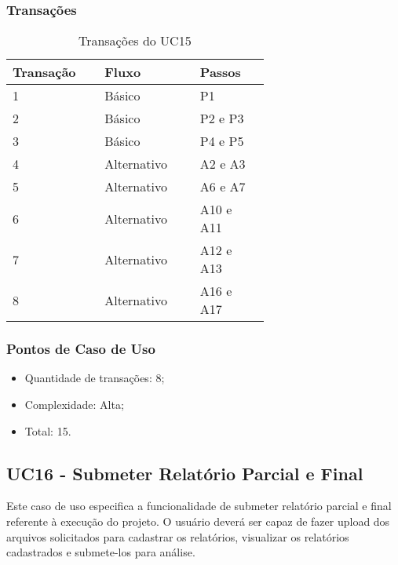   \subsubsection{Transações}

  \begin{table*}[!h]
  \centering
  \caption{Transações do UC15}
  \label{Rotulo}
    \begin{tabular}{|p{0.20\linewidth}|p{0.25\linewidth}|p{0.20\linewidth}|}
    \hline
    \textbf{Transação} & \textbf{Fluxo} & \textbf{Passos} \\ 
    \hline
    1 & Básico & P1\\
    \hline
    2 & Básico & P2 e P3\\
    \hline
    3 & Básico & P4 e P5\\
    \hline
    4 & Alternativo & A2 e A3\\
    \hline
    5 & Alternativo & A6 e A7\\
    \hline
    6 & Alternativo & A10 e A11\\
    \hline
    7 & Alternativo & A12 e A13\\
    \hline
    8 & Alternativo & A16 e A17\\
    \hline
    \end{tabular}
  \end{table*}

  \subsubsection{Pontos de Caso de Uso}

  \begin{itemize}
  \item Quantidade de transações: 8;
  \item Complexidade: Alta;
  \item Total: 15.
  \end{itemize}

  \vfill
  
\pagebreak
\subsection{UC16 - Submeter Relatório Parcial e Final}
  
  Este caso de uso especifica a funcionalidade de submeter relatório parcial e final referente à execução do projeto.
  O usuário deverá ser capaz de fazer upload dos arquivos solicitados para cadastrar os relatórios, visualizar os
  relatórios cadastrados e submete-los para análise.
  
